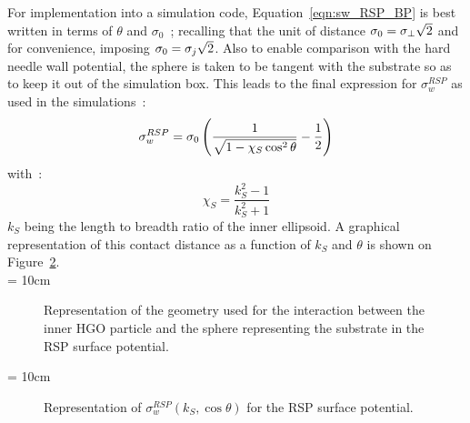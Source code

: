 For implementation into a simulation code, Equation~\ref{eqn:sw_RSP_BP} is best written
in terms of $\theta$ and $\sigma_0$~; recalling that the unit of distance 
$\sigma_0 = \sigma_\perp\sqrt{2}$ and for convenience, imposing $\sigma_0 = \sigma_j\sqrt{2}$. 
Also to enable
comparison with the hard needle wall potential, the sphere is taken to be tangent with the
substrate so as to keep it out of the simulation box. This leads to the final expression for
$\sigma^{RSP}_w$ as used in the simulations~:
%
\begin{equation}
	\sigma^{RSP}_w = \sigma_0\left( \frac{1}{\sqrt{1 - \chi_S\cos^2\theta}} - \frac{1}{2} \right)
	\label{eqn:sigma_w_RSP}
\end{equation}
%
with~:
%
\begin{equation}
	\chi_S = \frac{k^2_S - 1}{k^2_S + 1}
\end{equation}
%
$k_S$ being the length to breadth ratio of the inner ellipsoid. A graphical representation of
this contact distance  as a function of $k_S$ and $\theta$ is shown on
Figure~\ref{fig:sw_RSP}.\\

\picW = 10cm
\begin{figure}
	\centering
	\caption{Representation of the geometry used for the interaction between the inner HGO
	particle and the sphere representing the substrate in the RSP surface potential.}
	\label{fig:RSPConfig}
\end{figure}


\picW = 10cm
\begin{figure}
	\centering
	\caption{Representation of $\sigma^{RSP}_w(k_S, \cos\theta)$ for the RSP surface potential.}
	\label{fig:sw_RSP}
\end{figure}

